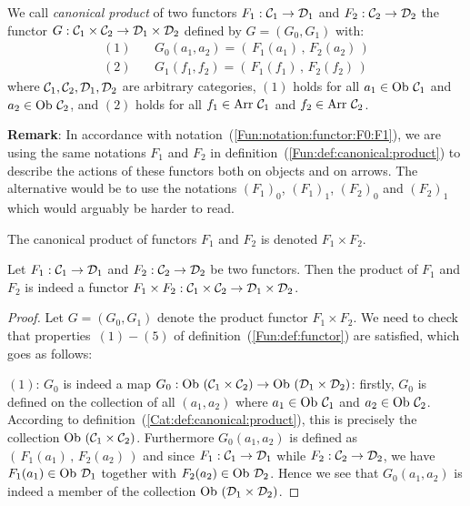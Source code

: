 \begin{defin}\label{Fun:def:canonical:product}
    We call {\em canonical product} of two functors $F_{1}:\mbox{${\cal C}_{1}$}\to\mbox{${\cal D}_{1}$}$ and
    $F_{2}:\mbox{${\cal C}_{2}$}\to\mbox{${\cal D}_{2}$}$ the functor $G:\mbox{${\cal C}_{1}$}\times\mbox{${\cal C}_{2}$}\to\mbox{${\cal D}_{1}$}\times\mbox{${\cal D}_{2}$}$
    defined by $G=(G_{0},G_{1})$ with:
        \begin{eqnarray*}
            (1)&\ &G_{0}(a_{1},a_{2}) = (\,F_{1}(a_{1})\,,\,F_{2}(a_{2})\,)\\
            (2)&\ &G_{1}(f_{1},f_{2}) = (\,F_{1}(f_{1})\,,\,F_{2}(f_{2})\,)
        \end{eqnarray*}
    where $\mbox{${\cal C}_{1}$},\mbox{${\cal C}_{2}$}, \mbox{${\cal D}_{1}$}, \mbox{${\cal D}_{2}$}$ are arbitrary categories, $(1)$ holds 
    for all $a_{1}\in\mbox{\rm Ob}\ \mbox{${\cal C}_{1}$}$ and $a_{2}\in\mbox{\rm Ob}\ \mbox{${\cal C}_{2}$}$, and $(2)$ holds 
    for all $f_{1}\in\mbox{\rm Arr}\ \mbox{${\cal C}_{1}$}$ and $f_{2}\in\mbox{\rm Arr}\ \mbox{${\cal C}_{2}$}$.
\end{defin}
\noindent
{\bf Remark}: In accordance with notation~(\ref{Fun:notation:functor:F0:F1}),
we are using the same notations $F_{1}$ and $F_{2}$ in 
definition~(\ref{Fun:def:canonical:product}) to describe the actions of these
functors both on objects and on arrows. The alternative would be to use the
notations $(F_{1})_{0}$, $(F_{1})_{1}$, $(F_{2})_{0}$ and $(F_{2})_{1}$ which 
would arguably be harder to read.

\begin{notation}\label{Fun:notation:canonical:product}
    The canonical product of functors $F_{1}$ and $F_{2}$ is denoted
    $F_{1}\times F_{2}$.
\end{notation}

\begin{prop}
    Let $F_{1}:\mbox{${\cal C}_{1}$}\to\mbox{${\cal D}_{1}$}$ and $F_{2}:\mbox{${\cal C}_{2}$}\to\mbox{${\cal D}_{2}$}$ be two functors. Then 
    the product of $F_{1}$ and $F_{2}$ is indeed a functor $F_{1}\times F_{2}: 
    \mbox{${\cal C}_{1}$}\times\mbox{${\cal C}_{2}$}\to\mbox{${\cal D}_{1}$}\times\mbox{${\cal D}_{2}$}$.
\end{prop}
\begin{proof}
    Let $G=(G_{0},G_{1})$ denote the product functor $F_{1}\times F_{2}$.
    We need to check that properties~$(1)-(5)$ of 
    definition~(\ref{Fun:def:functor}) are satisfied, which goes as follows:

    $(1)$: $G_{0}$ is indeed a map $G_{0}:\ob\ (\Cone\times\Ctwo)\to\ob\ (\Done
    \times\Dtwo)$: firstly, $G_{0}$ is defined on the 
    collection of all $(a_{1},a_{2})$ where $a_{1}\in\mbox{\rm Ob}\ \mbox{${\cal C}_{1}$}$
    and $a_{2}\in\mbox{\rm Ob}\ \mbox{${\cal C}_{2}$}$. According to 
    definition~(\ref{Cat:def:canonical:product}), this is precisely 
    the collection $\ob\ (\Cone\times\Ctwo)$. Furthermore $G_{0}(a_{1},a_{2})$
    is defined as $(\,F_{1}(a_{1})\,,\,F_{2}(a_{2})\,)$ and since 
    $F_{1}:\mbox{${\cal C}_{1}$}\to\mbox{${\cal D}_{1}$}$ while $F_{2}:\mbox{${\cal C}_{2}$}\to\mbox{${\cal D}_{2}$}$, we have $F_{1}(a_{1})
    \in\mbox{\rm Ob}\ \mbox{${\cal D}_{1}$}$ together with $F_{2}(a_{2})\in\mbox{\rm Ob}\ \mbox{${\cal D}_{2}$}$. Hence we see that
    $G_{0}(a_{1},a_{2})$ is indeed a member of the collection 
    $\ob\ (\Done\times\Dtwo)$.
\end{proof}
